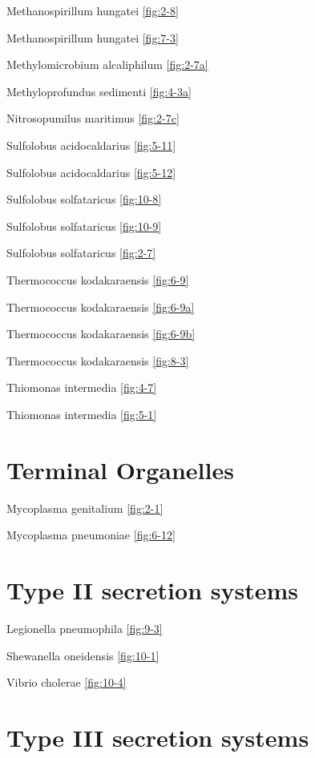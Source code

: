 \documentclass[]{tufte-book}
\begin{document}
Methanospirillum hungatei \ref{fig:2-8}

Methanospirillum hungatei \ref{fig:7-3}

Methylomicrobium alcaliphilum \ref{fig:2-7a}

Methyloprofundus sedimenti \ref{fig:4-3a}

Nitrosopumilus maritimus \ref{fig:2-7c}

Sulfolobus acidocaldarius \ref{fig:5-11}

Sulfolobus acidocaldarius \ref{fig:5-12}

Sulfolobus solfataricus \ref{fig:10-8}

Sulfolobus solfataricus \ref{fig:10-9}

Sulfolobus solfataricus \ref{fig:2-7}

Thermococcus kodakaraensis \ref{fig:6-9}

Thermococcus kodakaraensis \ref{fig:6-9a}

Thermococcus kodakaraensis \ref{fig:6-9b}

Thermococcus kodakaraensis \ref{fig:8-3}

Thiomonas intermedia \ref{fig:4-7}

Thiomonas intermedia \ref{fig:5-1}

\hypertarget{terminal-organelles}{%
\section*{Terminal Organelles}\label{terminal-organelles}}

Mycoplasma genitalium \ref{fig:2-1}

Mycoplasma pneumoniae \ref{fig:6-12}

\hypertarget{type-ii-secretion-systems}{%
\section*{Type II secretion systems}\label{type-ii-secretion-systems}}

Legionella pneumophila \ref{fig:9-3}

Shewanella oneidensis \ref{fig:10-1}

Vibrio cholerae \ref{fig:10-4}

\hypertarget{type-iii-secretion-systems}{%
\section*{Type III secretion systems}\label{type-iii-secretion-systems}}
\end{document}
